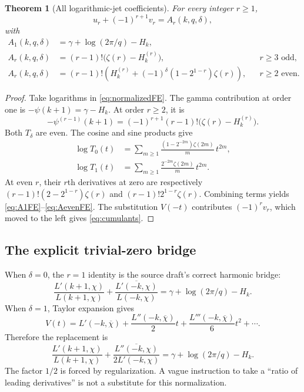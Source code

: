 \documentclass[11pt]{article}
\newtheorem{theorem}{Theorem}[section]
\theoremstyle{definition}
\theoremstyle{remark}
\begin{document}
\begin{theorem}[All logarithmic-jet coefficients]\label{thm:cumulants}
For every integer $r\geq1$,
\begin{equation}\label{eq:cumulants}
 u_r+(-1)^{r+1}v_r=A_r(k,q,\delta),
\end{equation}
with
\begin{align}
 A_1(k,q,\delta)&=\gamma+\log(2\pi/q)-H_k,\label{eq:A1FE}\\
 A_r(k,q,\delta)&=(r-1)!\bigl(\zeta(r)-H_k^{(r)}\bigr),
       &&r\geq3\text{ odd},\label{eq:AoddFE}\\
 A_r(k,q,\delta)&=(r-1)!\left(H_k^{(r)}
          +(-1)^\delta(1-2^{1-r})\zeta(r)\right),
       &&r\geq2\text{ even}.\label{eq:AevenFE}
\end{align}
\end{theorem}
\begin{proof}
Take logarithms in \eqref{eq:normalizedFE}. The gamma contribution at order one is $-\psi(k+1)=\gamma-H_k$. At order $r\geq2$, it is
\[
 -\psi^{(r-1)}(k+1)=(-1)^{r+1}(r-1)!
       \bigl(\zeta(r)-H_k^{(r)}\bigr).
\]
Both $T_\delta$ are even. The cosine and sine products give
\begin{align*}
 \log T_0(t)&=\sum_{m\geq1}\frac{(1-2^{-2m})\zeta(2m)}m\,t^{2m},\\
 \log T_1(t)&=\sum_{m\geq1}\frac{2^{-2m}\zeta(2m)}m\,t^{2m}.
\end{align*}
At even $r$, their $r$th derivatives at zero are respectively
$(r-1)!(2-2^{1-r})\zeta(r)$ and $(r-1)!2^{1-r}\zeta(r)$.
Combining terms yields \eqref{eq:A1FE}--\eqref{eq:AevenFE}. The substitution $V(-t)$ contributes $(-1)^rv_r$, which moved to the left gives \eqref{eq:cumulants}.
\end{proof}

\subsection{The explicit trivial-zero bridge}
When $\delta=0$, the $r=1$ identity is the source draft's correct harmonic bridge:
\begin{equation}\label{eq:bridge-nonzero}
 \frac{L'(k+1,\chi)}{L(k+1,\chi)}
   +\overline{\frac{L'(-k,\chi)}{L(-k,\chi)}}
       =\gamma+\log(2\pi/q)-H_k.
\end{equation}
When $\delta=1$, Taylor expansion gives
\[
 V(t)=L'(-k,\overline\chi)
       +\frac{L''(-k,\overline\chi)}2t
       +\frac{L'''(-k,\overline\chi)}6t^2+\cdots.
\]
Therefore the replacement is
\begin{equation}\label{eq:bridge-zero}
 \boxed{\quad
 \frac{L'(k+1,\chi)}{L(k+1,\chi)}
  +\overline{\frac{L''(-k,\chi)}{2L'(-k,\chi)}}
       =\gamma+\log(2\pi/q)-H_k.\quad}
\end{equation}
The factor $1/2$ is forced by regularization. A vague instruction to take a ``ratio of leading derivatives'' is not a substitute for this normalization.
\end{document}
